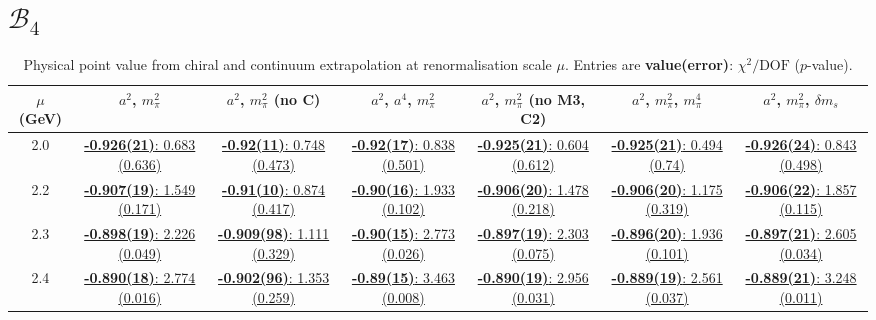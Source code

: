 \documentclass[12pt]{extarticle}
\begin{document}
\section{$\mathcal{B}_4$}
\begin{table}[h!]
\begin{center}
\begin{tabular}{|c|c|c|c|c|c|c|}
\hline
$\mu$ (GeV) & $a^2$, $m_\pi^2$& $a^2$, $m_\pi^2$ (no C)& $a^2$, $a^4$, $m_\pi^2$& $a^2$, $m_\pi^2$ (no M3, C2)& $a^2$, $m_\pi^2$, $m_\pi^4$& $a^2$, $m_\pi^2$, $\delta m_s$\\
\hline
2.0& \hyperlink{SSpPP/NPR/a2m2_20.pdf.1}{\textbf{-0.926(21)}: 0.683 (0.636)} & \hyperlink{SSpPP/NPR/a2m2noC_20.pdf.1}{\textbf{-0.92(11)}: 0.748 (0.473)} & \hyperlink{SSpPP/NPR/a2a4m2_20.pdf.1}{\textbf{-0.92(17)}: 0.838 (0.501)} & \hyperlink{SSpPP/NPR/a2m2mcut_20.pdf.1}{\textbf{-0.925(21)}: 0.604 (0.612)} & \hyperlink{SSpPP/NPR/a2m2m4_20.pdf.1}{\textbf{-0.925(21)}: 0.494 (0.74)} & \hyperlink{SSpPP/NPR/a2m2delm_20.pdf.1}{\textbf{-0.926(24)}: 0.843 (0.498)}\\
2.2& \hyperlink{SSpPP/NPR/a2m2_22.pdf.1}{\textbf{-0.907(19)}: 1.549 (0.171)} & \hyperlink{SSpPP/NPR/a2m2noC_22.pdf.1}{\textbf{-0.91(10)}: 0.874 (0.417)} & \hyperlink{SSpPP/NPR/a2a4m2_22.pdf.1}{\textbf{-0.90(16)}: 1.933 (0.102)} & \hyperlink{SSpPP/NPR/a2m2mcut_22.pdf.1}{\textbf{-0.906(20)}: 1.478 (0.218)} & \hyperlink{SSpPP/NPR/a2m2m4_22.pdf.1}{\textbf{-0.906(20)}: 1.175 (0.319)} & \hyperlink{SSpPP/NPR/a2m2delm_22.pdf.1}{\textbf{-0.906(22)}: 1.857 (0.115)}\\
2.3& \hyperlink{SSpPP/NPR/a2m2_23.pdf.1}{\textbf{-0.898(19)}: 2.226 (0.049)} & \hyperlink{SSpPP/NPR/a2m2noC_23.pdf.1}{\textbf{-0.909(98)}: 1.111 (0.329)} & \hyperlink{SSpPP/NPR/a2a4m2_23.pdf.1}{\textbf{-0.90(15)}: 2.773 (0.026)} & \hyperlink{SSpPP/NPR/a2m2mcut_23.pdf.1}{\textbf{-0.897(19)}: 2.303 (0.075)} & \hyperlink{SSpPP/NPR/a2m2m4_23.pdf.1}{\textbf{-0.896(20)}: 1.936 (0.101)} & \hyperlink{SSpPP/NPR/a2m2delm_23.pdf.1}{\textbf{-0.897(21)}: 2.605 (0.034)}\\
2.4& \hyperlink{SSpPP/NPR/a2m2_24.pdf.1}{\textbf{-0.890(18)}: 2.774 (0.016)} & \hyperlink{SSpPP/NPR/a2m2noC_24.pdf.1}{\textbf{-0.902(96)}: 1.353 (0.259)} & \hyperlink{SSpPP/NPR/a2a4m2_24.pdf.1}{\textbf{-0.89(15)}: 3.463 (0.008)} & \hyperlink{SSpPP/NPR/a2m2mcut_24.pdf.1}{\textbf{-0.890(19)}: 2.956 (0.031)} & \hyperlink{SSpPP/NPR/a2m2m4_24.pdf.1}{\textbf{-0.889(19)}: 2.561 (0.037)} & \hyperlink{SSpPP/NPR/a2m2delm_24.pdf.1}{\textbf{-0.889(21)}: 3.248 (0.011)}\\
\hline
\end{tabular}
\caption{Physical point value from chiral and continuum extrapolation at renormalisation scale $\mu$. Entries are \textbf{value(error)}: $\chi^2/\text{DOF}$ ($p$-value).}
\end{center}
\end{table}
\end{document}
